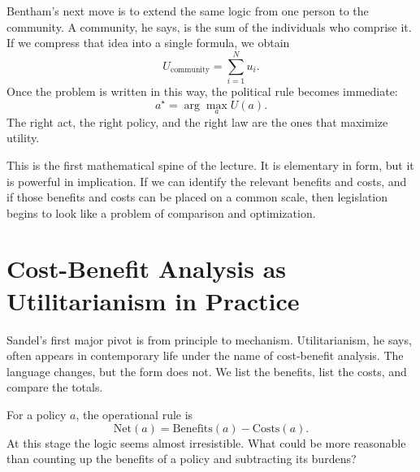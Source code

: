 Bentham's next move is to extend the same logic from one person to the community. A community, he says, is the sum of the individuals who comprise it. If we compress that idea into a single formula, we obtain
\begin{equation}
U_{\text{community}}=\sum_{i=1}^{N} u_i.
\end{equation}
Once the problem is written in this way, the political rule becomes immediate:
\begin{equation}
a^\star=\arg\max_a U(a).
\end{equation}
The right act, the right policy, and the right law are the ones that maximize utility.

This is the first mathematical spine of the lecture. It is elementary in form, but it is powerful in implication. If we can identify the relevant benefits and costs, and if those benefits and costs can be placed on a common scale, then legislation begins to look like a problem of comparison and optimization.

\section{Cost-Benefit Analysis as Utilitarianism in Practice}

Sandel's first major pivot is from principle to mechanism. Utilitarianism, he says, often appears in contemporary life under the name of cost-benefit analysis. The language changes, but the form does not. We list the benefits, list the costs, and compare the totals.

For a policy \(a\), the operational rule is
\begin{equation}
\text{Net}(a)=\text{Benefits}(a)-\text{Costs}(a).
\end{equation}
At this stage the logic seems almost irresistible. What could be more reasonable than counting up the benefits of a policy and subtracting its burdens?

